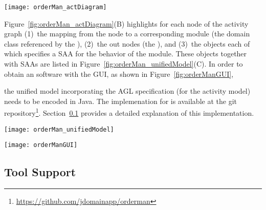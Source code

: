 \begin{figure*}[ht]
	\centering
	\texttt{[image: orderMan\_actDiagram]}
	\caption{The UML activity diagram for the process to handle orders, adapted from~\cite[p.~369]{omg_unified_2017}.} %
	\label{fig:orderMan_actDiagram}
\end{figure*}

Figure~\ref{fig:orderMan_actDiagram}(B) highlights for each node of the activity graph (1)~the mapping from the node to a corresponding module (\wrt the domain class referenced by the ), (2)~the out nodes (\wrt the ), and (3)~the  objects each of which specifies a SAA for the behavior of the module. These  objects together with SAAs are listed in Figure~\ref{fig:orderMan_unifiedModel}(C). In order to obtain an \orderman software with the GUI, as shown in Figure~\ref{fig:orderManGUI}, %

the unified model incorporating the AGL specification (for the activity model) needs to be encoded in Java. The implemenation for \orderman is available at the git repository\footnote{\url{https://github.com/jdomainapp/orderman}}. Section~\ref{subsect:toolSupport} provides a detailed explanation of this implementation.
%
\begin{figure*}[ht]
	\centering
	\texttt{[image: orderMan\_unifiedModel]}
	\caption{(A: Left) The activity graph whose nodes are labeled with activity and component classes; (B: Top-right) The  objects; (C: Bottom-right)  objects that are referenced by the .} %
	\label{fig:orderMan_unifiedModel}
\end{figure*}

\begin{figure*}[ht]
	\centering
	\texttt{[image: orderManGUI]}
	\caption{The GUI of the \orderman~software generated by the tool.} %
	\label{fig:orderManGUI}
\end{figure*}

\subsection{Tool Support}
\label{subsect:toolSupport} %


